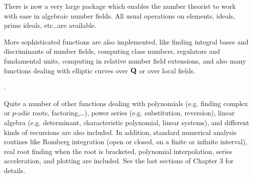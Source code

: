 There is now a very large package which enables the number theorist
to work with ease in algebraic number fields. All usual operations
on elements, ideals, prime ideals, etc\dots are available.

More sophisticated functions are also implemented, like finding integral
bases and discriminants of number fields, computing class numbers,
regulators and fundamental units, computing in relative number field
extensions, and also many functions dealing with
elliptic curves over $\Bbb Q$ or over local fields.

.

Quite a number of other functions dealing with polynomials (e.g. finding
complex or $p$-adic roots, factoring,\dots), power series
(e.g. substitution, reversion),
linear algebra (e.g. determinant, characteristic polynomial, linear
systems), and different kinds of recursions are also included. In addition,
standard numerical analysis routines like Romberg integration (open or closed,
on a finite or infinite interval), real root finding when the root is bracketed,
polynomial interpolation, series acceleration, and plotting are included.
See the last sections of Chapter 3 for details.

\vfill\eject









